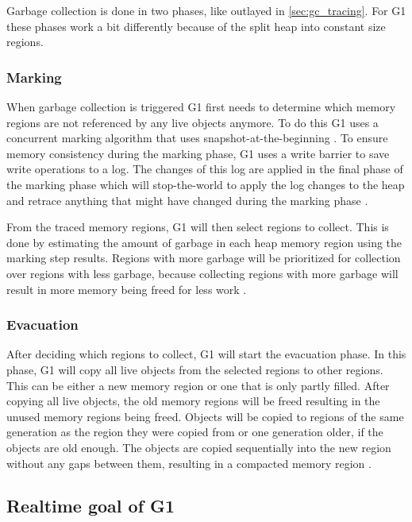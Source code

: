 Garbage collection is done in two phases, like outlayed in \autoref{sec:gc_tracing}.
For G1 these phases work a bit differently because of the split heap into constant size regions.

\subsubsection{Marking}

When garbage collection is triggered G1 first needs to determine
which memory regions are not referenced by any live objects anymore.
To do this G1 uses a concurrent marking algorithm that 
uses snapshot-at-the-beginning \cite[2.5 Concurrent Marking]{java_g1_2004}.
To ensure memory consistency during the marking phase, G1 uses a write barrier
to save write operations to a log.
The changes of this log are applied in the final phase of the marking phase
which will stop-the-world to apply the log changes to the heap
and retrace anything that might have changed during the marking phase \cite[2.2 Remembered Set Maintance]{java_g1_2004}.

From the traced memory regions, G1 will then select regions to collect.
This is done by estimating the amount of garbage in each heap memory region using the marking step results.
Regions with more garbage will be prioritized for collection over regions with less garbage,
because collecting regions with more garbage will result in more memory being freed for less work \cite[2.5 Concurrent Marking]{java_g1_2004}.

\subsubsection{Evacuation}

After deciding which regions to collect, G1 will start the evacuation phase.
In this phase, G1 will copy all live objects from the selected regions to other regions.
This can be either a new memory region or one that is only partly filled.
After copying all live objects, the old memory regions will be freed resulting
in the unused memory regions being freed.
Objects will be copied to regions of the same generation as the region they were copied from
or one generation older, if the objects are old enough.
The objects are copied sequentially into the new region without any gaps between them,
resulting in a compacted memory region \cite[2.3 Evacuation Pauses]{java_g1_2004}.

\subsection{Realtime goal of G1}

